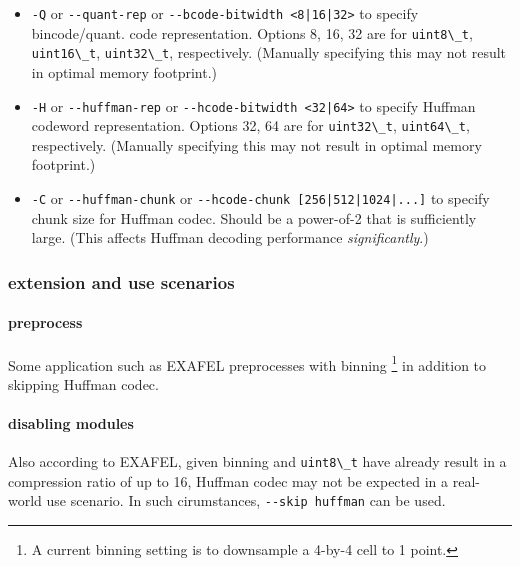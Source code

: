 \begin{itemize}
\item
  \passthrough{\lstinline!-Q!} or \passthrough{\lstinline!--quant-rep!}
  or \passthrough{\lstinline!--bcode-bitwidth <8|16|32>!} to specify
  bincode/quant. code representation. Options 8, 16, 32 are for
  \passthrough{\lstinline!uint8\_t!},
  \passthrough{\lstinline!uint16\_t!},
  \passthrough{\lstinline!uint32\_t!}, respectively. (Manually
  specifying this may not result in optimal memory footprint.)
\item
  \passthrough{\lstinline!-H!} or
  \passthrough{\lstinline!--huffman-rep!} or
  \passthrough{\lstinline!--hcode-bitwidth <32|64>!} to specify Huffman
  codeword representation. Options 32, 64 are for
  \passthrough{\lstinline!uint32\_t!},
  \passthrough{\lstinline!uint64\_t!}, respectively. (Manually
  specifying this may not result in optimal memory footprint.)
\item
  \passthrough{\lstinline!-C!} or
  \passthrough{\lstinline!--huffman-chunk!} or
  \passthrough{\lstinline!--hcode-chunk [256|512|1024|...]!} to specify
  chunk size for Huffman codec. Should be a power-of-2 that is
  sufficiently large. (This affects Huffman decoding performance
  \emph{significantly}.)
\end{itemize}

\subsubsection{extension and use scenarios}

\paragraph{preprocess}

Some application such as EXAFEL preprocesses with binning \footnote{A
  current binning setting is to downsample a 4-by-4 cell to 1 point.} in
addition to skipping Huffman codec.

\paragraph{disabling modules}

Also according to EXAFEL, given binning and
\passthrough{\lstinline!uint8\_t!} have already result in a compression
ratio of up to 16, Huffman codec may not be expected in a real-world use
scenario. In such cirumstances, \passthrough{\lstinline!--skip huffman!}
can be used.

